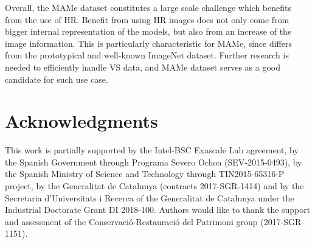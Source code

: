 \documentclass{article}
\begin{document}
Overall, the MAMe dataset constitutes a large scale challenge which benefits from the use of HR. Benefit from using HR images does not only come from bigger internal representation of the models, but also from an increase of the image information. This is particularly characteristic for MAMe, since differs from the prototypical and well-known ImageNet dataset. Further research is needed to efficiently handle VS data, and MAMe dataset serves as a good candidate for such use case.


\section*{Acknowledgments}
This work is partially supported by the Intel-BSC Exascale Lab agreement, by the Spanish Government through Programa Severo Ochoa (SEV-2015-0493), by the Spanish Ministry of Science and Technology through TIN2015-65316-P project, by the Generalitat de Catalunya (contracts 2017-SGR-1414) and by the Secretaria d’Universitats i Recerca of the Generalitat de Catalunya under the 
 Industrial Doctorate Grant DI 2018-100. Authors would like to thank the support and assessment of the Conservació-Restauració del Patrimoni group (2017-SGR-1151).



   
\end{document}
